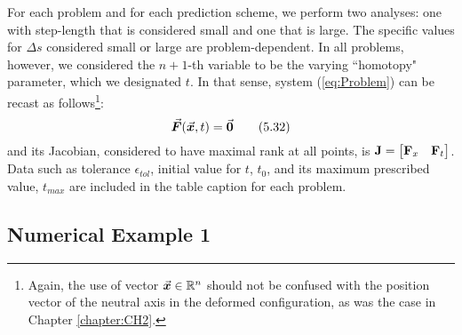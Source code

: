 For each problem and for each prediction scheme, we perform two analyses: one
with step-length that is considered small and one that is large. The specific 
values
for $\Delta s$ considered small or large are problem-dependent. In all
problems, however, we considered the $n+1$-th variable to be the varying 
``homotopy"
parameter, which we designated $t$. In that sense, system (\ref{eq:Problem}) 
can be recast as follows\footnote{Again, the use of vector 
$\vec{\bm{x}}\in\mathbb{R}^n$ should not be confused with the position vector of 
the neutral axis in the deformed configuration, as was the case in Chapter 
\ref{chapter:CH2}.}:
\begin{equation}
	\vec{\bm{F}}(\vec{\bm{x}},t)=\vec{\bm{0}}
	\tag{5.32}\label{eq:MProb}
\end{equation}
and its Jacobian, considered to have maximal rank at all points, is $\mathbf{J} =
\begin{bmatrix}
	\mathbf{F}_x & \mathbf{F}_t
\end{bmatrix}
$. Data such as tolerance $\epsilon_{tol}$, initial value for $t$,
$t_0$, and its maximum prescribed value, $t_{max}$ are included in
the table caption for each problem.

\subsection{Numerical Example 1}

